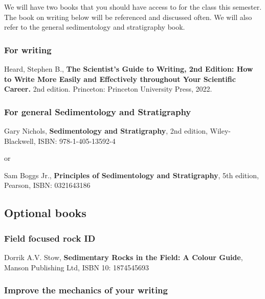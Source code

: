 \documentclass[11pt,]{article}
\begin{document}
We will have two books that you should have access to for the class this
semester. The book on writing below will be referenced and discussed
often. We will also refer to the general sedimentology and stratigraphy
book.

\hypertarget{for-writing}{%
\subsubsection{For writing}\label{for-writing}}

Heard, Stephen B., \textbf{The Scientist's Guide to Writing, 2nd
Edition: How to Write More Easily and Effectively throughout Your
Scientific Career.} 2nd edition. Princeton: Princeton University Press,
2022.

\hypertarget{for-general-sedimentology-and-stratigraphy}{%
\subsubsection{For general Sedimentology and
Stratigraphy}\label{for-general-sedimentology-and-stratigraphy}}

Gary Nichols, \textbf{Sedimentology and Stratigraphy}, 2nd edition,
Wiley-Blackwell, ISBN: 978-1-405-13592-4

or

Sam Boggs Jr., \textbf{Principles of Sedimentology and Stratigraphy},
5th edition, Pearson, ISBN: 0321643186

\hypertarget{optional-books}{%
\subsection{Optional books}\label{optional-books}}

\hypertarget{field-focused-rock-id}{%
\subsubsection{Field focused rock ID}\label{field-focused-rock-id}}

Dorrik A.V. Stow, \textbf{Sedimentary Rocks in the Field: A Colour
Guide}, Manson Publishing Ltd, ISBN 10: 1874545693

\hypertarget{improve-the-mechanics-of-your-writing}{%
\subsubsection{Improve the mechanics of your
writing}\label{improve-the-mechanics-of-your-writing}}
\end{document}
